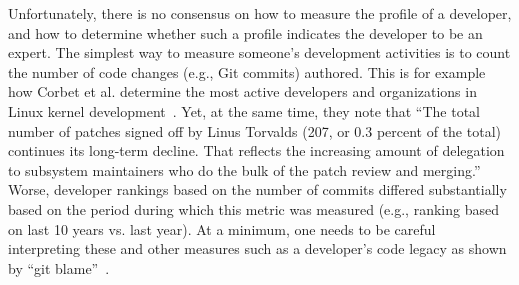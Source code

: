 Unfortunately, there is no consensus on how to measure the profile of a developer, and how to determine whether such a profile indicates the developer to be an expert. The simplest way to measure someone's development activities is to count the number of code changes (e.g., Git commits) authored. This is for example how Corbet et al. determine the most active developers and organizations in Linux kernel development~\cite{corbet17}. Yet, at the same time, they note that ``The total number of patches signed off by Linus Torvalds (207, or 0.3 percent of the total) continues its long-term decline. That reflects the increasing amount of delegation to subsystem maintainers who do the bulk of the patch review and merging.'' Worse, developer rankings based on the number of commits differed substantially based on the period during which this metric was measured (e.g., ranking based on last 10 years vs. last year). At a minimum, one needs to be careful interpreting these and other measures such as a developer's code legacy as shown by ``git blame''~\cite{Bhattacharya, mockus02, McDonald, Fritz-2007}.%

%
%
%

